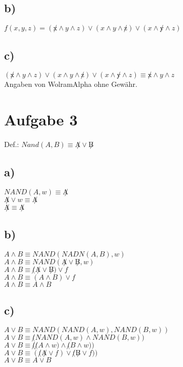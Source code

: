 \documentclass{article}
\begin{document}
	\subsection*{b)}
	$f(x, y, z) = (\not x \land y \land z) \lor (x \land y \land \not z) \lor (x \land \not y \land z)$ 
%	
	\subsection*{c)}
	$(\not x \land y \land z) \lor (x \land y \land \not z) \lor (x \land \not y \land z) \equiv \not x \land y \land z$ \\
	Angaben von WolramAlpha ohne Gewähr.
	
	\section*{Aufgabe 3}
	Def.: $ Nand (A, B) \equiv \not A \lor \not B$
	\subsection*{a)}
	$NAND(A, w) \equiv \not A$ \\
	$\not A \lor w \equiv \not A$ \\
	$\not A \equiv \not A$
	
	\subsection*{b)}
	$A \land B \equiv NAND(NADN(A,B), w)$ \\
	$A \land B \equiv NAND(\not A \lor \not B, w)$ \\
	$A \land B \equiv \not (\not A \lor \not B) \lor  f$ \\
	$A \land B \equiv  ( A \land  B) \lor  f$ \\
	$A \land B \equiv  A \land  B$
	
	\subsection*{c)}
	$A \lor B \equiv NAND(NAND(A, w),NAND(B, w))$ \\
	$A \lor B \equiv \not (NAND(A, w) \land NAND(B, w))$ \\
	$A \lor B \equiv \not (\not (A \land w) \land \not (B \land w))$ \\
	$A \lor B \equiv (\not (\not A \lor f) \lor \not (\not B \lor f))$ \\
	$A \lor B \equiv A \lor  B$ \\
\end{document}
